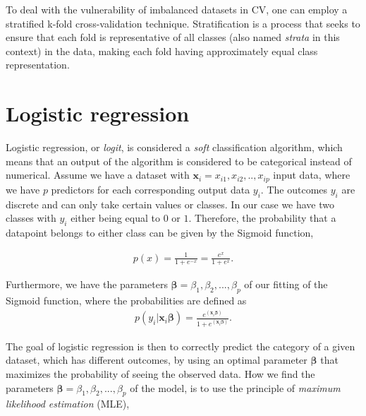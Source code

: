 To deal with the vulnerability of imbalanced datasets in CV, one can employ a stratified k-fold cross-validation technique. Stratification is a process that seeks to ensure that each fold is representative of all classes (also named \textit{strata} in this context) in the data, making each fold having approximately equal class representation.

\section{Logistic regression}

Logistic regression, or \textit{logit}, is considered a \textit{soft} classification algorithm, which means that an output of the algorithm is considered to be categorical instead of numerical. Assume we have a dataset with $\boldsymbol{x}_i = {x_{i1}, x_{i2}, .., x_{ip}}$ input data, where we have $p$ predictors for each corresponding output data $y_i$. The outcomes $y_i$ are discrete and can only take certain values or classes. In our case we have two classes with $y_i$ either being equal to $0$ or $1$. Therefore, the probability that a datapoint belongs to either class can be given by the Sigmoid function, %

\begin{align*}
p(x) = \frac{1}{1+ e^{-x}} = \frac{e^{x}}{1+ e^{x}}.
\end{align*}

\noindent Furthermore, we have the parameters $\boldsymbol{\beta} = {\beta_1, \beta_2, ..., \beta_p}$ of our fitting of the Sigmoid function, where the probabilities are defined as
\begin{align*}
p(y_i|\boldsymbol{x}_i \boldsymbol{\beta}) = \frac{e^{(\boldsymbol{x}_i \boldsymbol{\beta})}}{1 + e^{(\boldsymbol{x}_i \boldsymbol{\beta})}}.
\end{align*}

\noindent The goal of logistic regression is then to correctly predict the category of a given dataset, which has different outcomes, by using an optimal parameter $\boldsymbol{\beta}$ that maximizes the probability of seeing the observed data. How we find the parameters $\boldsymbol{\beta} = {\beta_1, \beta_2, ..., \beta_p}$ of the model, is to use the principle of \textit{maximum likelihood estimation} (MLE),


